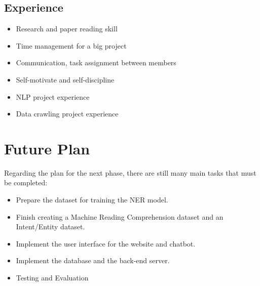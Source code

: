 \subsection{Experience}
\begin{itemize}
    \item Research and paper reading skill
    \item Time management for a big project
    \item Communication, task assignment between members
    \item Self-motivate and self-discipline
    \item NLP project experience
    \item Data crawling project experience
\end{itemize}

\section{Future Plan}
Regarding the plan for the next phase, there are still many main tasks that must be completed:

\begin{itemize}
    \item Prepare the dataset for training the NER model.
    \item Finish creating a Machine Reading Comprehension dataset and an Intent/Entity dataset.
    \item Implement the user interface for the website and chatbot.
    \item Implement the database and the back-end server.
    \item Testing and Evaluation
\end{itemize}